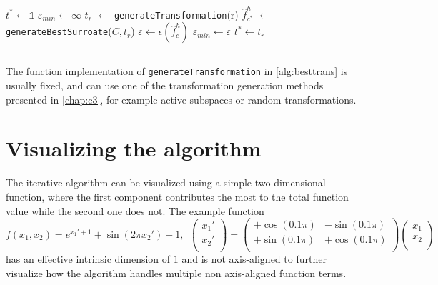 \documentclass[
  a4paper,  %
  twoside,  %
  bibliography=totoc,
  headsepline,
  cleardoublepage=empty,
  parskip=half,
  draft=false
]{scrbook}
\newcommand{\delimit}{{\color{silver}\noindent\rule{\textwidth}{1pt}}}
\begin{document}
\begin{mdframed}[style=algstyle,frametitle={\textbf{function} \texttt{generateBestTransformation}{$(r_{\text{min}} ,r_{\text{max}})$}}]
\normalsize
\vspace{5.5mm}
\begin{algorithmic}[1]
    \State $t^\ast \gets \mathds{1}$
    \State $\varepsilon_{min} \gets \infty$
      \State $t_r$ $\gets$ \texttt{generateTransformation}(r)
      \State $\hat{f}_{c^\ast}^h$ $\gets$ \texttt{generateBestSurroate}($C, t_r$)
    	\State $\varepsilon \gets \epsilon(\hat{f}_c^h)$
    	  \State $\varepsilon_{min}\gets \varepsilon$
    	\State $t^\ast \gets t_r$
    	\EndIf
    \EndFor
    \State {}
\end{algorithmic}
\vspace{-1.5mm}
\delimit
	\label{alg:besttrans}
\end{mdframed}

The function implementation of \texttt{generateTransformation} in \cref{alg:besttrans} is usually fixed, and can use one of the transformation generation methods presented in \cref{chap:c3}, for example active subspaces or random transformations.

\section{Visualizing the algorithm}

The iterative algorithm can be visualized using a simple two-dimensional function, where the first component contributes the most to the total function value while the second one does not.
The example function
\begin{equation}
f(x_1, x_2)=e^{x_1' + 1} + \sin(2 \pi x_2') + 1, ~~ \begin{pmatrix}
    x_1' \\ x_2'
    \\
  \end{pmatrix} = \begin{pmatrix}
    +\cos(0.1 \pi) & -\sin(0.1 \pi)\\
    +\sin(0.1 \pi) & +\cos(0.1 \pi)
    \\
  \end{pmatrix}\begin{pmatrix}
    x_1 \\ x_2
    \\
  \end{pmatrix}
\end{equation}
has an effective intrinsic dimension of $1$ and is not axis-aligned to further visualize how the algorithm handles multiple non axis-aligned function terms.
\end{document}
